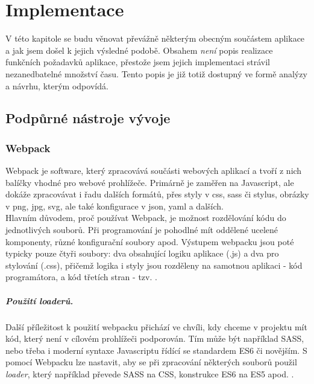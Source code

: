 \chapter{Implementace}\label{implementation}

V této kapitole se budu věnovat převážně některým obecným součástem aplikace a jak jsem došel k jejich výsledné podobě. Obsahem \emph{není} popis realizace funkčních požadavků aplikace, přestože jsem jejich implementaci strávil nezanedbatelné množství času. Tento popis je již totiž dostupný ve formě analýzy a návrhu, kterým odpovídá.\\


\section{Podpůrné nástroje vývoje}

\subsection{Webpack}

Webpack \cite{webpack} je software, který zpracovává součásti webových aplikací a tvoří z nich balíčky vhodné pro webové prohlížeče. Primárně je zaměřen na Javascript, ale dokáže zpracovávat i řadu dalších formátů, přes styly v css, sass či stylus, obrázky v png, jpg, svg, ale také konfigurace v json, yaml a dalších.\\
Hlavním důvodem, proč používat Webpack, je možnost rozdělování kódu do jednotlivých souborů. Při programování je pohodlné mít oddělené ucelené komponenty, různé konfigurační soubory apod. Výstupem webpacku jsou poté typicky pouze čtyři soubory: dva obsahující logiku aplikace (.js) a dva pro stylování (.css), přičemž logika i styly jsou rozděleny na samotnou aplikaci - kód programátora, a kód třetích stran - tzv. .

\paragraph{Použití loaderů.} Další příležitost k použití webpacku přichází ve chvíli, kdy chceme v projektu mít kód, který není v cílovém prohlížeči podporován. Tím může být například SASS, nebo třeba i moderní syntaxe Javascriptu řídící se standardem ES6 či novějším. S pomocí Webpacku lze nastavit, aby se při zpracování některých souborů použil \emph{loader}, který například převede SASS na CSS, konstrukce ES6 na ES5 apod. \cite{webpack-ackee}.

